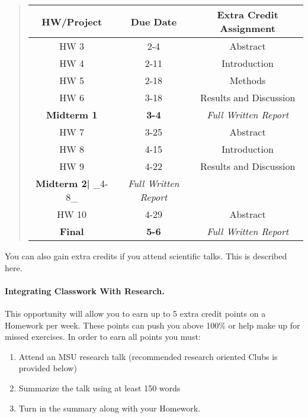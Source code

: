 \documentclass[%
oneside,                 %
final,                   %
10pt]{article}
\begin{document}
\begin{quote}
\begin{tabular}{ccc}
\hline
\multicolumn{1}{c}{ HW/Project } & \multicolumn{1}{c}{ Due Date } & \multicolumn{1}{c}{ Extra Credit Assignment } \\
\hline
HW 3                      & 2-4                        & Abstract                   \\
HW 4                      & 2-11                       & Introduction               \\
HW 5                      & 2-18                       & Methods                    \\
HW 6                      & 3-18                       & Results and Discussion     \\
\textbf{Midterm 1}        & \textbf{3-4}               & \emph{Full Written Report} \\
HW 7                      & 3-25                       & Abstract                   \\
HW 8                      & 4-15                       & Introduction               \\
HW 9                      & 4-22                       & Results and Discussion     \\
\textbf{Midterm 2|} _4-8_ & \emph{Full Written Report} \\
HW 10                     & 4-29                       & Abstract                   \\
\textbf{Final}            & \textbf{5-6}               & \emph{Full Written Report} \\
\hline
\end{tabular}
\end{quote}

\noindent
You can also gain extra credits if you attend scientific talks.
This is described here.

\paragraph{Integrating Classwork With Research.}
This opportunity will allow you to earn up to 5 extra credit points on a Homework per week. These points can push you above 100\% or help make up for missed exercises.
In order to earn all points you must:

\begin{enumerate}
\item Attend an MSU research talk (recommended research oriented Clubs is  provided below)

\item Summarize the talk using at least 150 words

\item Turn in the summary along with your Homework.
\end{enumerate}
\end{document}
